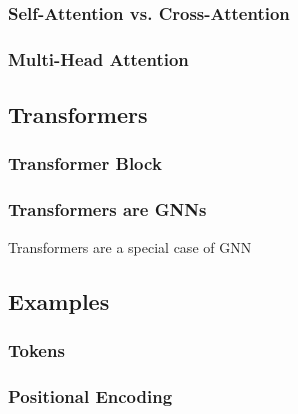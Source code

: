 \subsubsection{Self-Attention vs. Cross-Attention}
\begin{notes}
    
\end{notes}

\subsubsection{Multi-Head Attention}
\begin{notes}
    
\end{notes}

\subsection{Transformers}
\begin{notes}

\end{notes}

\subsubsection{Transformer Block}
\begin{notes}
    
\end{notes}

\subsubsection{Transformers are GNNs}
\begin{summary} Transformers are a special case of GNN
\end{summary}

\subsection{Examples}
\subsubsection{Tokens}
\begin{example}
\end{example}

\subsubsection{Positional Encoding}
\begin{example}
\end{example}
